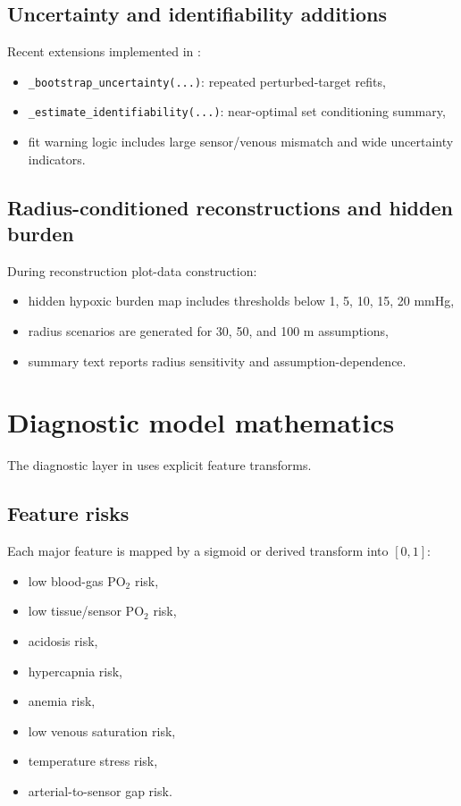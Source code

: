 \documentclass[12pt,a4paper]{article}
\begin{document}
\subsection{Uncertainty and identifiability additions}
Recent extensions implemented in :
\begin{itemize}
    \item \texttt{\_bootstrap\_uncertainty(...)}: repeated perturbed-target refits,
    \item \texttt{\_estimate\_identifiability(...)}: near-optimal set conditioning summary,
    \item fit warning logic includes large sensor/venous mismatch and wide uncertainty indicators.
\end{itemize}

\subsection{Radius-conditioned reconstructions and hidden burden}
During reconstruction plot-data construction:
\begin{itemize}
    \item hidden hypoxic burden map includes thresholds below 1, 5, 10, 15, 20 mmHg,
    \item radius scenarios are generated for 30, 50, and 100 \textmu m assumptions,
    \item summary text reports radius sensitivity and assumption-dependence.
\end{itemize}

\section{Diagnostic model mathematics}
The diagnostic layer in  uses explicit feature transforms.

\subsection{Feature risks}
Each major feature is mapped by a sigmoid or derived transform into $[0,1]$:
\begin{itemize}
    \item low blood-gas PO$_2$ risk,
    \item low tissue/sensor PO$_2$ risk,
    \item acidosis risk,
    \item hypercapnia risk,
    \item anemia risk,
    \item low venous saturation risk,
    \item temperature stress risk,
    \item arterial-to-sensor gap risk.
\end{itemize}
\end{document}
